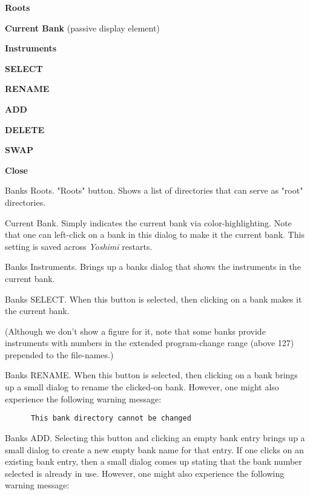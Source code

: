    \begin{enumber}
      \item \textbf{Roots}
      \item \textbf{Current Bank} (passive display element)
      \item \textbf{Instruments}
      \item \textbf{SELECT}
      \item \textbf{RENAME}
      \item \textbf{ADD}
      \item \textbf{DELETE}
      \item \textbf{SWAP}
      \item \textbf{Close}
   \end{enumber}

   \setcounter{ItemCounter}{0}      %

   Banks Roots.
   "Roots" button.
   Shows a list of directories that can serve as "root" directories.

   Current Bank.  Simply indicates the current bank via color-highlighting.
   Note that one can left-click on a bank in this dialog to make it the
   current bank.  This setting is saved across \textsl{Yoshimi} restarts.

   Banks Instruments.
   Brings up a banks dialog that shows the instruments in the current bank.

   Banks SELECT.
   When this button is selected, then clicking on a bank makes it the current
   bank.

   (Although we don't show a figure for it, note that some banks provide
   instruments with numbers in the extended program-change range (above
   127) prepended to the file-names.)

   Banks RENAME.
   When this button is selected, then clicking on a bank brings
   up a small dialog to rename the clicked-on bank.
   However, one might also experience the following warning message:

   \begin{verbatim}
      This bank directory cannot be changed
   \end{verbatim}

   Banks ADD.
   Selecting this button and clicking an empty bank entry brings up a small
   dialog to create a new empty bank name for that entry.
   If one clicks on an existing bank entry, then a small dialog comes up
   stating that the bank number selected is already in use.
   However, one might also experience the following warning message:

